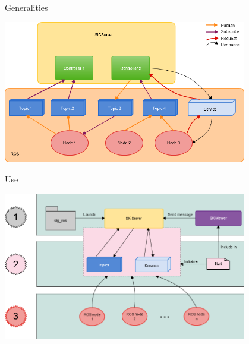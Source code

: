 \documentclass[11pt]{beamer}
\begin{document}
\begin{frame}{Generalities}
	\begin{center}
		\includegraphics[width=0.8\textwidth]{images/sig_ros_general.png}
	\end{center}
\end{frame}

\begin{frame}{Use}
	\begin{center}
		\includegraphics[width=0.8\textwidth]{images/usage.png}
	\end{center}
\end{frame}
\end{document}

